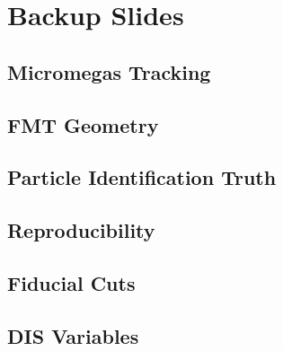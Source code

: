 \section*{}
\begin{frame}{}
    \centering \Huge{}
\end{frame}

\section*{Backup Slides}
\subsection*{Micromegas Tracking}


\subsection*{FMT Geometry}


\subsection*{Particle Identification Truth}


\subsection*{Reproducibility}


\subsection*{Fiducial Cuts}


\subsection*{DIS Variables}


% 

% 

